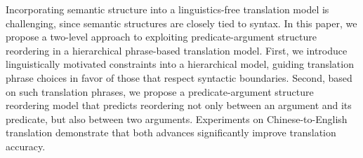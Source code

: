Incorporating semantic structure into a linguistics-free translation model is challenging, since semantic structures are closely tied to syntax. In this
 paper, we propose a two-level approach to exploiting predicate-argument
 structure reordering in a hierarchical phrase-based translation model. First,
 we introduce linguistically motivated constraints into a hierarchical model,
 guiding translation phrase choices in favor of those that respect syntactic
 boundaries. Second, based on such translation phrases, we propose a
 predicate-argument structure reordering model that predicts reordering not only
 between an argument and its predicate, but also between two arguments.
 Experiments on Chinese-to-English translation demonstrate that both advances
 significantly improve translation accuracy.

